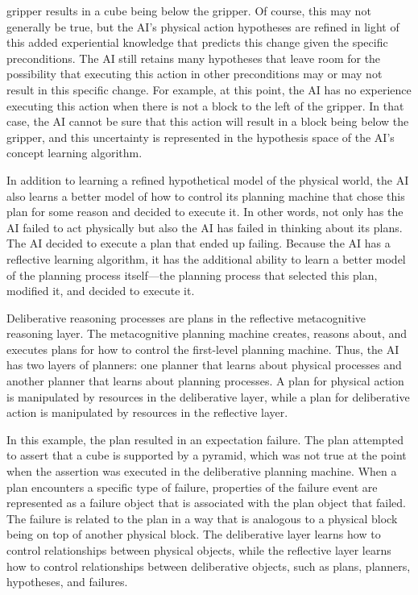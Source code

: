 gripper results in a cube being below the gripper.  Of course, this
may not generally be true, but the AI's physical action hypotheses are
refined in light of this added experiential knowledge that predicts
this change given the specific preconditions.  The AI still retains
many hypotheses that leave room for the possibility that executing
this action in other preconditions may or may not result in this
specific change.  For example, at this point, the AI has no experience
executing this action when there is not a block to the left of the
gripper.  In that case, the AI cannot be sure that this action will
result in a block being below the gripper, and this uncertainty is
represented in the hypothesis space of the AI's concept learning
algorithm.

In addition to learning a refined hypothetical model of the physical
world, the AI also learns a better model of how to control its
planning machine that chose this plan for some reason and decided to
execute it.  In other words, not only has the AI failed to act
physically but also the AI has failed in thinking about its plans.
The AI decided to execute a plan that ended up failing.  Because the
AI has a reflective learning algorithm, it has the additional ability
to learn a better model of the planning process itself---the planning
process that selected this plan, modified it, and decided to execute
it.

Deliberative reasoning processes are plans in the reflective
metacognitive reasoning layer.  The metacognitive planning machine
creates, reasons about, and executes plans for how to control the
first-level planning machine.  Thus, the AI has two layers of
planners: one planner that learns about physical processes and another
planner that learns about planning processes.  A plan for physical
action is manipulated by resources in the deliberative layer, while a
plan for deliberative action is manipulated by resources in the
reflective layer.

In this example, the plan resulted in an expectation failure.  The
plan attempted to assert that a cube is supported by a pyramid, which
was not true at the point when the assertion was executed in the
deliberative planning machine.  When a plan encounters a specific type
of failure, properties of the failure event are represented as a
failure object that is associated with the plan object that failed.
The failure is related to the plan in a way that is analogous to a
physical block being on top of another physical block.  The
deliberative layer learns how to control relationships between
physical objects, while the reflective layer learns how to control
relationships between deliberative objects, such as plans, planners,
hypotheses, and failures.

